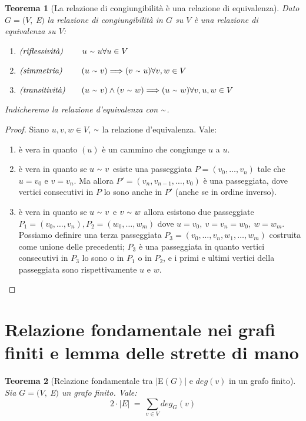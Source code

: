 \documentclass[12pt]{article}
\newcommand{\implica}{\Longrightarrow}
\newcommand{\Eps}{$E\:$}
\newcommand{\MathEps}{E}
\newcommand{\grafo}{(V, \: \Eps)}
\newcommand{\til}{\raise.17ex\hbox{$\scriptstyle\mathtt{\sim}$}}
\newtheorem{theorem}{Teorema}
\begin{document}
\begin{theorem}[La relazione di congiungibilità è una relazione di equivalenza]
	Dato $G = \grafo$ la relazione di congiungibilità in $G$ su $V$ è una relazione di equivalenza su $V$:
	\begin{enumerate}
		\item$\textit{(riflessività) }\qquad u\ \til\ u \hfill \forall u \in V$
		\item$\textit{(simmetria) }\qquad (u\ \til\ v) \implica (v\ \til\ u) \hfill \forall v, w \in V$
		\item$\textit{(transitività)}\qquad (u\ \til\ v) \land (v\ \til\ w) \implica (u\ \til \ w) \hfill \forall v, u, w \in V$
	\end{enumerate}
	Indicheremo la relazione d'equivalenza con $\til$.
\end{theorem}

\begin{proof}
	Siano $u, v, w \in V$, $\til$ la relazione d'equivalenza. Vale:
	\begin{enumerate}
		\item è vera in quanto $(u)$ è un cammino che congiunge $u$ a $u$.
		\item è vera in quanto se $u\ \til\ v$ esiste una passeggiata $P = (v_0,\ldots, v_n)$ tale che $u = v_0$ e $v = v_n$. Ma allora $P' = (v_n, v_{n-1},\ldots ,v_0)$ è una passeggiata, dove vertici consecutivi in $P$ lo sono anche in $P'$ (anche se in ordine inverso).
		\item è vera in quanto se $u\ \til\ v$ e $v\ \til\ w$ allora esistono due passeggiate $P_1 = (v_0,\ldots ,v_n), P_2 = (w_0,\ldots, w_m)$ dove $u = v_0,\ v = v_n = w_0,\ w = w_m$. Possiamo definire una terza passeggiata $P_3 = (v_0,\ldots ,v_n,w_1,\ldots ,w_m)$ costruita come unione delle precedenti; $P_3$ è una passeggiata in quanto vertici consecutivi in $P_3$ lo sono o in $P_1$ o in $P_2$, e i primi e ultimi vertici della passeggiata sono rispettivamente $u$ e $w$.
	\end{enumerate}
\end{proof}

\section{Relazione fondamentale nei grafi finiti e lemma delle strette di mano}
\begin{theorem}[Relazione fondamentale tra $|\Eps(G)|$ e $deg(v)$ in un grafo finito]
	Sia $G = \grafo$ un grafo finito. Vale:
	$$ 2 \cdot | \MathEps | \ = \ \sum_{v\in V} deg_G (v) $$
\end{theorem}
\end{document}
